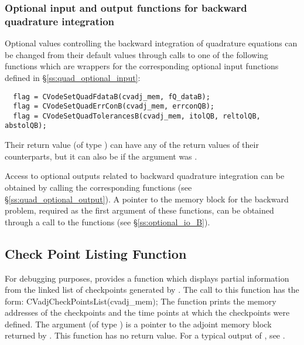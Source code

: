 \subsubsection{Optional input and output functions for backward quadrature integration}

Optional values controlling the backward integration of quadrature equations can be changed
from their default values through calls to one of the following functions which are wrappers for
the corresponding optional input functions defined in \S\ref{ss:quad_optional_input}:
\begin{verbatim}
  flag = CVodeSetQuadFdataB(cvadj_mem, fQ_dataB);
  flag = CVodeSetQuadErrConB(cvadj_mem, errconQB);
  flag = CVodeSetQuadTolerancesB(cvadj_mem, itolQB, reltolQB, abstolQB);
\end{verbatim}
Their return value  (of type ) can have any of the return values 
of their counterparts, but it can also be  if the  
argument was . 

Access to optional outputs related to backward quadrature integration can be obtained
by calling the corresponding  functions 
(see \S\ref{ss:quad_optional_output}). 
A pointer to the {\cvodes} memory block for the backward problem, required as the first 
argument of these functions, can be obtained through a call to the functions 
 (see \S\ref{ss:optional_io_B}).


\subsection{Check Point Listing Function}

For debugging purposes, {\cvodes} provides a function  which
displays partial information from the linked list of checkpoints generated by
. The call to this function has the form:
{
  CVadjCheckPointsList(cvadj\_mem);
}
{
  The function  prints
  the memory addresses of the checkpoints and the time points at
  which the checkpoints were defined.
}
{
  The argument  (of type ) is a pointer to the
  adjoint memory block returned by .
}
{
  This function has no return value.
}
{
  For a typical output of , see \cite{cvodes2.1.0_ex}.
}
